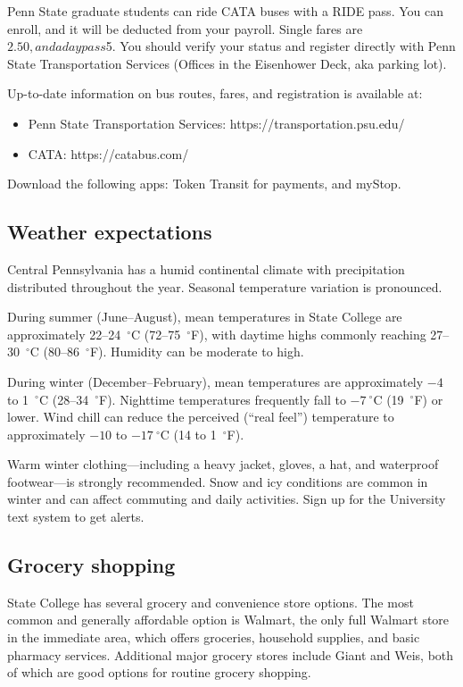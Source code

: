 \documentclass[11pt, oneside]{article}   	%
\begin{document}
Penn State graduate students can ride CATA buses with a RIDE pass. You can enroll, and it will be deducted from your payroll. Single fares are $2.50, and a daypass $5. You should verify your status and register directly with Penn State Transportation Services (Offices in the Eisenhower Deck, aka parking lot).

Up-to-date information on bus routes, fares, and registration is available at:
\begin{itemize}
  \item Penn State Transportation Services: https://transportation.psu.edu/
  \item CATA: https://catabus.com/
\end{itemize}

Download the following apps: Token Transit for payments, and myStop.

\subsection{Weather expectations}
Central Pennsylvania has a humid continental climate with precipitation distributed throughout the year. Seasonal temperature variation is pronounced.

During summer (June--August), mean temperatures in State College are approximately 22--24~$^\circ$C (72--75~$^\circ$F), with daytime highs commonly reaching 27--30~$^\circ$C (80--86~$^\circ$F). Humidity can be moderate to high.

During winter (December--February), mean temperatures are approximately $-4$ to 1~$^\circ$C (28--34~$^\circ$F). Nighttime temperatures frequently fall to $-7~^\circ$C (19~$^\circ$F) or lower. Wind chill can reduce the perceived (“real feel”) temperature to approximately $-10$ to $-17~^\circ$C (14 to 1~$^\circ$F).

Warm winter clothing—including a heavy jacket, gloves, a hat, and waterproof footwear—is strongly recommended. Snow and icy conditions are common in winter and can affect commuting and daily activities. Sign up for the University text system to get alerts.

\subsection{Grocery shopping}
State College has several grocery and convenience store options. The most common and generally affordable option is Walmart, the only full Walmart store in the immediate area, which offers groceries, household supplies, and basic pharmacy services. Additional major grocery stores include Giant and Weis, both of which are good options for routine grocery shopping.
\end{document}
